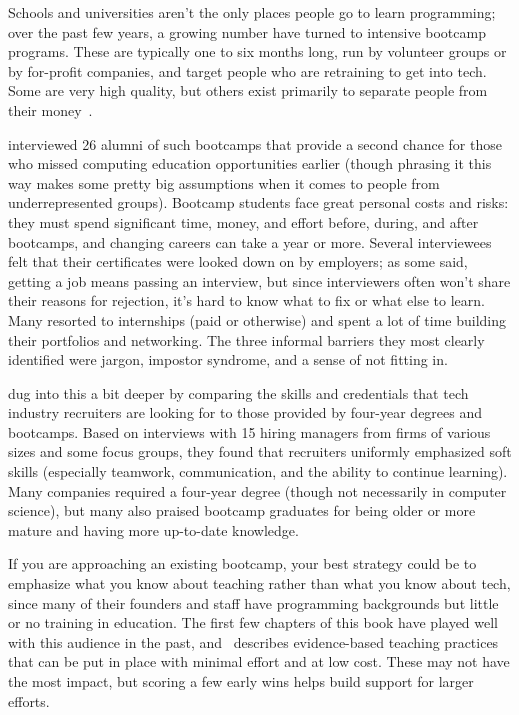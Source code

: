
Schools and universities aren't the only places people go to learn programming;
over the past few years, a growing number have turned to intensive bootcamp programs.
These are typically one to six months long,
run by volunteer groups or by for-profit companies,
and target people who are retraining to get into tech.
Some are very high quality,
but others exist primarily to separate people from their money~\cite{McMi2017}.

\cite{Thay2017} interviewed 26 alumni of such bootcamps
that provide a second chance for those who missed computing education opportunities earlier
(though phrasing it this way makes some pretty big assumptions
when it comes to people from underrepresented groups).
Bootcamp students face great personal costs and risks:
they must spend significant time, money, and effort before, during, and after bootcamps,
and changing careers can take a year or more.
Several interviewees felt that their certificates were looked down on by employers;
as some said,
getting a job means passing an interview,
but since interviewers often won't share their reasons for rejection,
it's hard to know what to fix or what else to learn.
Many resorted to internships (paid or otherwise)
and spent a lot of time building their portfolios and networking.
The three informal barriers they most clearly identified were jargon,
impostor syndrome,
and a sense of not fitting in.

\cite{Burk2018} dug into this a bit deeper
by comparing the skills and credentials that tech industry recruiters are looking for
to those provided by four-year degrees and bootcamps.
Based on interviews with 15 hiring managers from firms of various sizes and some focus groups,
they found that recruiters uniformly emphasized soft skills
(especially teamwork, communication, and the ability to continue learning).
Many companies required a four-year degree
(though not necessarily in computer science),
but many also praised bootcamp graduates for being older or more mature
and having more up-to-date knowledge.

If you are approaching an existing bootcamp,
your best strategy could be to emphasize what you know about teaching
rather than what you know about tech,
since many of their founders and staff have programming backgrounds
but little or no training in education.
The first few chapters of this book have played well with this audience in the past,
and~\cite{Lang2016} describes
evidence-based teaching practices that can be put in place
with minimal effort and at low cost.
These may not have the most impact,
but scoring a few early wins helps build support for larger efforts.

